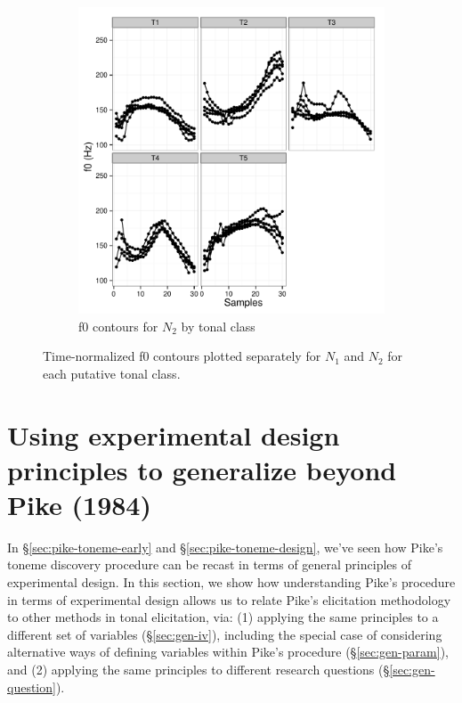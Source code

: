 \documentclass[12pt]{article}
\begin{document}
\begin{figure}
\begin{subfigure}[t]{0.5\textwidth}
  \centering
  \includegraphics[width=\textwidth]{kiy-20111213-plot-w2-facet}
  \caption{f0 contours for $N_2$ by tonal class}
  \label{fig:kiy-20111213-plot-w2-facet}
\end{subfigure}
\caption{Time-normalized f0 contours plotted separately for $N_1$ and
  $N_2$ for each putative tonal class.}\label{fig:w1w2-facet}
\end{figure}


\clearpage

\section{Using experimental design principles to generalize beyond
  Pike (1984)}
\label{sec:generalize-exp-design}

In \S\ref{sec:pike-toneme-early} and \S\ref{sec:pike-toneme-design},
we've seen how Pike's toneme discovery procedure can be recast in
terms of general principles of experimental design. In this section,
we show how understanding Pike's procedure in terms of experimental
design allows us to relate Pike's elicitation methodology to other
methods in tonal elicitation, via: (1) applying the same principles to
a different set of variables
(\S\ref{sec:gen-iv}), including the special case
of considering alternative ways of defining variables within Pike's
procedure (\S\ref{sec:gen-param}), and (2) applying the same
principles to different research questions (\S\ref{sec:gen-question}).
\end{document}

